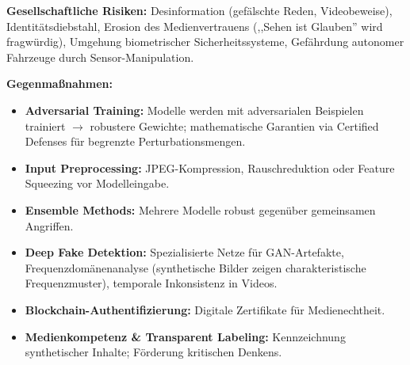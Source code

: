 \textbf{Gesellschaftliche Risiken:} Desinformation (gefälschte Reden, Videobeweise), Identitätsdiebstahl, Erosion des Medienvertrauens (,,Sehen ist Glauben'' wird fragwürdig), Umgehung biometrischer Sicherheitssysteme, Gefährdung autonomer Fahrzeuge durch Sensor-Manipulation.

\textbf{Gegenmaßnahmen:}
\begin{itemize}[leftmargin=1.5em]
    \item \textbf{Adversarial Training:} Modelle werden mit adversarialen Beispielen trainiert $\to$ robustere Gewichte; mathematische Garantien via Certified Defenses für begrenzte Perturbationsmengen.
    \item \textbf{Input Preprocessing:} JPEG-Kompression, Rauschreduktion oder Feature Squeezing vor Modelleingabe.
    \item \textbf{Ensemble Methods:} Mehrere Modelle robust gegenüber gemeinsamen Angriffen.
    \item \textbf{Deep Fake Detektion:} Spezialisierte Netze für GAN-Artefakte, Frequenzdomänenanalyse (synthetische Bilder zeigen charakteristische Frequenzmuster), temporale Inkonsistenz in Videos.
    \item \textbf{Blockchain-Authentifizierung:} Digitale Zertifikate für Medienechtheit.
    \item \textbf{Medienkompetenz \& Transparent Labeling:} Kennzeichnung synthetischer Inhalte; Förderung kritischen Denkens.
\end{itemize}